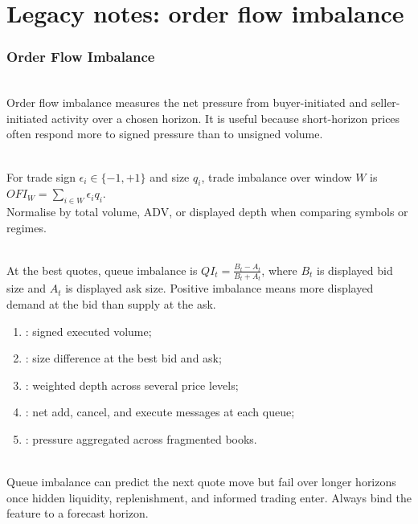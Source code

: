 \documentclass[a4paper,oneside,openany]{book}
\begin{document}
\chapter*{Legacy notes: order flow imbalance}

\subsection*{Order Flow Imbalance}

\begin{definition} \\
Order flow imbalance measures the net pressure from buyer-initiated and seller-initiated activity over a chosen horizon. It is useful because short-horizon prices often respond more to signed pressure than to unsigned volume.
\end{definition}

\begin{model} \\
For trade sign $\epsilon_i\in\{-1,+1\}$ and size $q_i$, trade imbalance over window $W$ is $OFI_W=\sum\limits_{i\in W}\epsilon_i q_i$.\\
Normalise by total volume, ADV, or displayed depth when comparing symbols or regimes.
\end{model}

\begin{model} \\
At the best quotes, queue imbalance is $QI_t=\frac{B_t-A_t}{B_t+A_t}$, where $B_t$ is displayed bid size and $A_t$ is displayed ask size. Positive imbalance means more displayed demand at the bid than supply at the ask.
\end{model}

\begin{taxonomy} 
\begin{enumerate}[label=\roman*.]
\setlength{\itemsep}{0pt}
\item {}: signed executed volume;
\item {}: size difference at the best bid and ask;
\item {}: weighted depth across several price levels;
\item {}: net add, cancel, and execute messages at each queue;
\item {}: pressure aggregated across fragmented books.
\end{enumerate}
\end{taxonomy}

\begin{caveat} \\
Queue imbalance can predict the next quote move but fail over longer horizons once hidden liquidity, replenishment, and informed trading enter. Always bind the feature to a forecast horizon.
\end{caveat}
\end{document}
